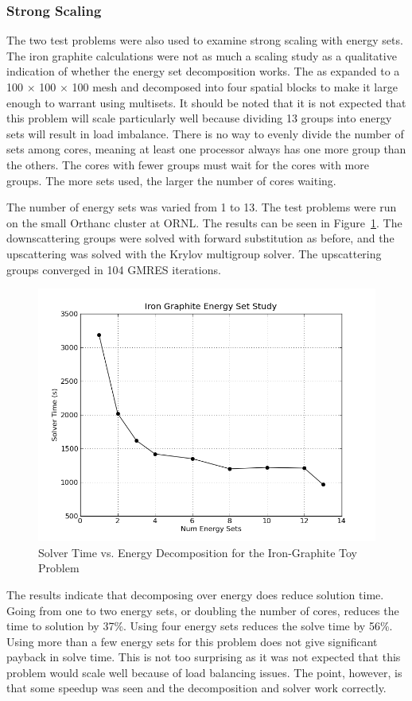 \subsubsection{Strong Scaling}
The two test problems were also used to examine strong scaling with energy sets. The iron graphite calculations were not as much a scaling study as a qualitative indication of whether the energy set decomposition works. The as expanded to a 100 $\times$ 100 $\times$ 100 mesh and decomposed into four spatial blocks to make it large enough to warrant using multisets. It should be noted that it is not expected that this problem will scale particularly well because dividing 13 groups into energy sets will result in load imbalance. There is no way to evenly divide the number of sets among cores, meaning at least one processor always has one more group than the others. The cores with fewer groups must wait for the cores with more groups. The more sets used, the larger the number of cores waiting.

The number of energy sets was varied from 1 to 13. The test problems were run on the small Orthanc cluster at ORNL. The results can be seen in Figure~\ref{fig:FeGraphiteStudy}. The downscattering groups were solved with forward substitution as before, and the upscattering was solved with the Krylov multigroup solver. The upscattering groups converged in 104 GMRES iterations.

\begin{figure}[!h]
  \begin{center}
    \includegraphics [width=.85\textwidth, height=0.5\textheight ] {FeGraphiteEnergyStudy}
  \end{center}
  \caption{Solver Time vs. Energy Decomposition for the Iron-Graphite Toy Problem}
  \label{fig:FeGraphiteStudy}
\end{figure}
%
The results indicate that decomposing over energy does reduce solution time. Going from one to two energy sets, or doubling the number of cores, reduces the time to solution by 37\%. Using four energy sets reduces the solve time by 56\%. Using more than a few energy sets for this problem  does not give significant payback in solve time. This is not too surprising as it was not expected that this problem would scale well because of load balancing issues. The point, however, is that some speedup was seen and the decomposition and solver work correctly.

